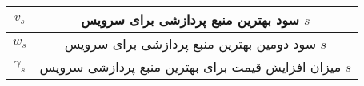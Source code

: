 \begin{table}[h]
\begin{tabularx}{\textwidth}{|c|C|}
        $v_s$               & سود بهترین منبع پردازشی برای سرویس $s$                                                     \\ \hline
        $w_s$               & سود دومین بهترین منبع پردازشی برای سرویس $s$                                               \\ \hline
        $\gamma_s$          & میزان افزایش قیمت برای بهترین منبع پردازشی سرویس $s$                                       \\ \hline
      \end{tabularx}
      \label{tbl:system_model:notation}
    \end{table}
